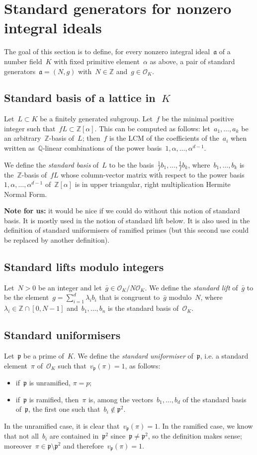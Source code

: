 \documentclass{article}
\def\Z{{\mathbb Z}}
\def\Q{{\mathbb Q}}
\def\OO{{\mathcal O}}
\def\a{{\mathfrak a}}
\def\p{{\mathfrak p}}
\begin{document}
\section{Standard generators for nonzero integral ideals}

The goal of this section is to define, for every nonzero integral ideal~$\a$ of
a number field~$K$ with fixed primitive element~$\alpha$ as above, a pair of
standard generators~$\a = (N,g)$ with~$N\in\Z$ and~$g\in\OO_K$.

\subsection{Standard basis of a lattice in~$K$}
Let~$L\subset K$ be a finitely generated subgroup. Let~$f$ be the minimal
positive integer such that~$f L \subset \Z[\alpha]$. This can be computed as
follows: let~$a_1,\dots,a_k$ be an arbitrary~$\Z$-basis of~$L$; then~$f$ is the
LCM of the coefficients of the~$a_i$ when written as~$\Q$-linear combinations of
the power basis~$1,\alpha,\dots,\alpha^{d-1}$.

We define the \emph{standard basis} of~$L$ to be the
basis~$\frac{1}{f}b_1,\dots,\frac{1}{f}b_k$, where~$b_1,\dots,b_k$ is
the~$\Z$-basis of~$fL$ whose column-vector matrix with respect to the power
basis~$1,\alpha,\dots,\alpha^{d-1}$ of~$\Z[\alpha]$ is in upper triangular,
right multiplication Hermite Normal Form.

\textbf{Note for us:} it would be nice if we could do without this notion of standard
basis. It is mostly used in the notion of standard lift below. It is also used in the
definition of standard uniformisers of ramified primes (but this second use
could be replaced by another definition).

\subsection{Standard lifts modulo integers}
Let~$N>0$ be an integer and let~$\bar{g}\in\OO_K/N\OO_K$. We define the \emph{standard
lift} of~$\bar{g}$ to be the element~$g = \sum_{i=1}^d \lambda_i b_i$ that is
congruent to~$\bar{g}$ modulo~$N$, where~$\lambda_i\in \Z\cap [0,N-1]$
and~$b_1,\dots,b_n$ is the standard basis of~$\OO_K$.

\subsection{Standard uniformisers}
Let~$\p$ be a prime of~$K$. We define the \emph{standard uniformiser} of~$\p$,
i.e. a standard element~$\pi$ of~$\OO_K$ such that~$v_\p(\pi)=1$, as follows:
\begin{itemize}
  \item if~$\p$ is unramified, $\pi=p$;
  \item if~$\p$ is ramified, then~$\pi$ is, among the vectors~$b_1,\dots,b_d$ of
    the standard basis of~$\p$, the first one such that~$b_i\notin\p^2$.
\end{itemize}
In the unramified case, it is clear that~$v_\p(\pi)=1$. In the ramified case, we
know that not all~$b_i$ are contained in~$\p^2$ since~$\p\neq\p^2$, so the
definition makes sense; moreover~$\pi \in\p\setminus\p^2$ and
therefore~$v_\p(\pi)=1$.
\end{document}
